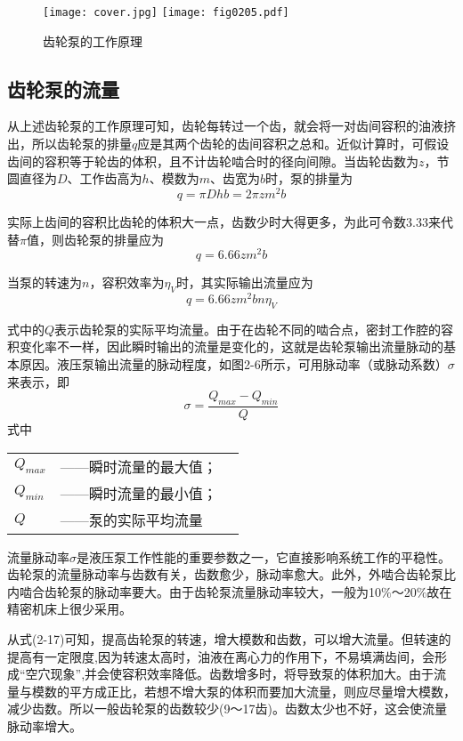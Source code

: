 \begin{figure}
\centering
\ifOpenSource
\texttt{[image: cover.jpg]}
\else
\texttt{[image: fig0205.pdf]}%
\fi
\caption{齿轮泵的工作原理}
\label{fig:fig0205}%
\end{figure}


\subsection{齿轮泵的流量}

从上述齿轮泵的工作原理可知，齿轮每转过一个齿，就会将一对齿间容积的油液挤出，所以齿轮泵的排量$q$应是其两个齿轮的齿间容积之总和。近似计算时，可假设齿间的容积等于轮齿的体积，且不计齿轮啮合时的径向间隙。当齿轮齿数为$z$，节圆直径为$D$、工作齿高为$h$、模数为$m$、齿宽为$b$时，泵的排量为
\begin{equation}
  q=\pi D h b=2\pi z m^2 b
\end{equation}

实际上齿间的容积比齿轮的体积大一点，齿数少时大得更多，为此可令数3.33来代替$\pi$值，则齿轮泵的排量应为
\begin{equation}
  q=6.66 z m^2 b
\end{equation}

当泵的转速为$n$，容积效率为$\eta_{V}$时，其实际输出流量应为
\begin{equation}
  q=6.66 z m^2 b n \eta_{V}
\end{equation}

式中的$Q$表示齿轮泵的实际平均流量。由于在齿轮不同的啮合点，密封工作腔的容积变化率不一样，因此瞬时输出的流量是变化的，这就是齿轮泵输出流量脉动的基本原因。液压泵输出流量的脉动程度，如图2-6所示，可用脉动率（或脉动系数）$\sigma$来表示，即
\begin{equation}
  \sigma=\frac{{Q_{max}-Q_{min}}}{Q}
\end{equation} 
\noindent 式中\
\begin{tabular}[t]{lll}
  $Q_{max}$ &——瞬时流量的最大值；\\
  $Q_{min}$ &——瞬时流量的最小值；\\
  $Q$ &——泵的实际平均流量
  \end{tabular}
流量脉动率$\sigma$是液压泵工作性能的重要参数之一，它直接影响系统工作的平稳性。齿轮泵的流量脉动率与齿数有关，齿数愈少，脉动率愈大。此外，外啮合齿轮泵比内啮合齿轮泵的脉动率要大。由于齿轮泵流量脉动率较大，一般为10$\%$～20$\%$故在精密机床上很少采用。

从式(2-17)可知，提高齿轮泵的转速，增大模数和齿数，可以增大流量。但转速的提高有一定限度,因为转速太高时，油液在离心力的作用下，不易填满齿间，会形成“空穴现象”,并会使容积效率降低。齿数增多时，将导致泵的体积加大。由于流量与模数的平方成正比，若想不增大泵的体积而要加大流量，则应尽量增大模数，减少齿数。所以一般齿轮泵的齿数较少(9～17齿)。齿数太少也不好，这会使流量脉动率增大。


